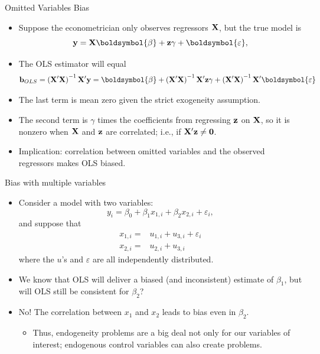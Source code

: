\documentclass[aspectratio=169,11pt]{beamer}
\begin{document}
\begin{frame}{Omitted Variables Bias}
\begin{itemize}
	\item Suppose the econometrician only observes regressors ${\bf X} $, but the true model is\[
			{\bf y}= {\bf X} \boldsymbol{\beta} + {\bf z} \gamma + \boldsymbol{\varepsilon},
	\]

	\item The OLS estimator will equal\[
	{\bf b}_{OLS} = \left({\bf X}'{\bf X}\right)^{-1} {\bf X}' {\bf y} = \boldsymbol{\beta}  + \left({\bf X}'{\bf X}\right)^{-1} {\bf X}' {\bf z} \gamma + \left({\bf X}'{\bf X}\right)^{-1} {\bf X}' \boldsymbol{\varepsilon}
	\]

	\item The last term is mean zero given the strict exogeneity assumption.

	\item The second term is $\gamma$ times the coefficients from regressing ${\bf z}$ on ${\bf X}$, so it is
	nonzero when ${\bf X}$ and ${\bf z}$ are correlated; i.e., if $ {\bf X}' {\bf z} \ne {\bf 0}$.

	\item Implication:  correlation between omitted variables and the observed regressors makes OLS biased.

	
\end{itemize}
\end{frame}







\begin{frame}{Bias with multiple variables}
\begin{itemize}
		\item<1-> Consider a model with two variables:\[
			y_i = \beta_0 + \beta_1 x_{1,i} + \beta_2 x_{2,i} + \varepsilon_i,
		\]
		and suppose that
		\begin{align*}
			x_{1,i} =& u_{1,i} + u_{3,i} + \varepsilon_i  \\
			x_{2,i} =& u_{2,i} + u_{3,i}
		\end{align*}		
		where the $u$'s and $\varepsilon$ are all independently distributed. 
		
		\item<1-> We know that OLS will deliver
		a biased (and inconsistent) estimate of $\beta_{1}$, but will OLS still be consistent for $\beta_2$?
		
		\medskip
		\item<2-> No! The correlation between $x_1$ and $x_2$ leads to bias even
		in $\beta_2$.
		\begin{itemize}
			\item<2-> Thus, endogeneity problems are a big deal not only for our variables of interest; endogenous
			control variables can also create problems.
		\end{itemize}
\end{itemize}
\end{frame}
\end{document}
